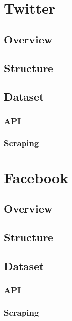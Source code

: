 


\section {Twitter} %

\subsection {Overview}

\subsection {Structure}

\subsection {Dataset}
\subsubsection {API}
\subsubsection {Scraping}



\section {Facebook} %

\subsection {Overview}

\subsection {Structure}

\subsection {Dataset}
\subsubsection {API}
\subsubsection {Scraping}
